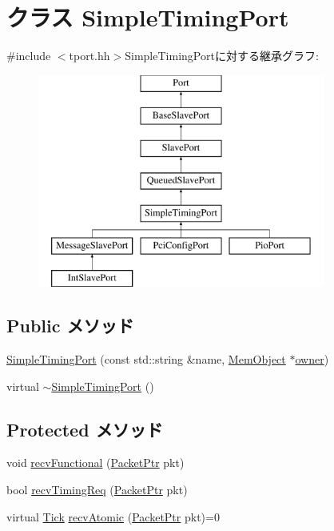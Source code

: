 \hypertarget{classSimpleTimingPort}{
\section{クラス SimpleTimingPort}
\label{classSimpleTimingPort}
}


{\ttfamily \#include $<$tport.hh$>$}SimpleTimingPortに対する継承グラフ:\begin{figure}[H]
\begin{center}
\leavevmode
\includegraphics[height=7cm]{classSimpleTimingPort}
\end{center}
\end{figure}
\subsection*{Public メソッド}
\begin{DoxyCompactItemize}
\item 
\hyperlink{classSimpleTimingPort_a2273fa04bdf4a7c437c885569c7df97b}{SimpleTimingPort} (const std::string \&name, \hyperlink{classMemObject}{MemObject} $\ast$\hyperlink{classPort_aba966efb6c1df4b015be3a396df6c318}{owner})
\item 
virtual \hyperlink{classSimpleTimingPort_a4a2041c97513fa07a0941771519c951d}{$\sim$SimpleTimingPort} ()
\end{DoxyCompactItemize}
\subsection*{Protected メソッド}
\begin{DoxyCompactItemize}
\item 
void \hyperlink{classSimpleTimingPort_aeefa907fb6d6a787e6dab90e8138ea90}{recvFunctional} (\hyperlink{classPacket}{PacketPtr} pkt)
\item 
bool \hyperlink{classSimpleTimingPort_a3344d9dd0f83257feab5424e761f31c6}{recvTimingReq} (\hyperlink{classPacket}{PacketPtr} pkt)
\item 
virtual \hyperlink{base_2types_8hh_a5c8ed81b7d238c9083e1037ba6d61643}{Tick} \hyperlink{classSimpleTimingPort_a428ab07671bc9372dc44a2487b12a726}{recvAtomic} (\hyperlink{classPacket}{PacketPtr} pkt)=0
\end{DoxyCompactItemize}
